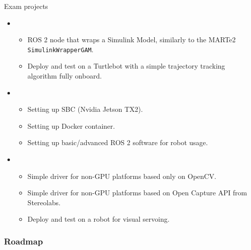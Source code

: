 \documentclass[aspectratio=169]{beamer}
\begin{document}
\frame{\titlepage}

\begin{frame}{Exam projects}
	\begin{itemize}
		\item {}
		      \begin{itemize}
			      \item ROS 2 node that wraps a Simulink Model, similarly to the MARTe2 \texttt{SimulinkWrapperGAM}.
			      \item Deploy and test on a Turtlebot with a simple trajectory tracking algorithm fully onboard.
		      \end{itemize}
		\item {}
		      \begin{itemize}
			      \item Setting up SBC (Nvidia Jetson TX2).
			      \item Setting up Docker container.
			      \item Setting up basic/advanced ROS 2 software for robot usage.
		      \end{itemize}
		\item {}
		      \begin{itemize}
			      \item Simple driver for non-GPU platforms based only on OpenCV.
			      \item Simple driver for non-GPU platforms based on Open Capture API from Stereolabs.
			      \item Deploy and test on a robot for visual servoing.
		      \end{itemize}
	\end{itemize}
\end{frame}

\begin{frame}
	\frametitle{Roadmap}
	\tableofcontents
\end{frame}












\end{document}
